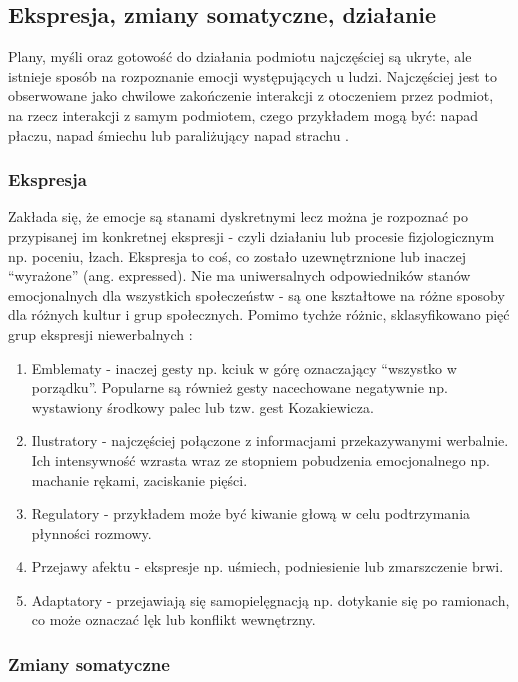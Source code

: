 \subsection{Ekspresja, zmiany somatyczne, działanie}

Plany, myśli oraz gotowość do działania podmiotu najczęściej są ukryte, ale istnieje sposób na rozpoznanie emocji występujących u ludzi. Najczęściej jest to obserwowane jako chwilowe zakończenie interakcji z otoczeniem przez podmiot, na rzecz interakcji z samym podmiotem, czego przykładem mogą być: napad płaczu, napad śmiechu lub paraliżujący napad strachu \citep{oatly}.

\subsubsection{Ekspresja}

Zakłada się, że emocje są stanami dyskretnymi lecz można je rozpoznać po przypisanej im konkretnej ekspresji - czyli działaniu lub procesie fizjologicznym np. poceniu, łzach. Ekspresja to coś, co zostało uzewnętrznione lub inaczej ``wyrażone'' (ang. expressed). Nie ma uniwersalnych odpowiedników stanów emocjonalnych dla wszystkich społeczeństw - są one kształtowe na różne sposoby dla różnych kultur i grup społecznych. Pomimo tychże różnic, sklasyfikowano pięć grup ekspresji niewerbalnych \citep{oatly}:
\begin{enumerate}
  \item Emblematy - inaczej gesty np. kciuk w górę oznaczający ``wszystko w porządku''. Popularne są również gesty nacechowane negatywnie np. wystawiony środkowy palec lub tzw. gest Kozakiewicza.
  \item Ilustratory - najczęściej połączone z informacjami przekazywanymi werbalnie. Ich intensywność wzrasta wraz ze stopniem pobudzenia emocjonalnego np. machanie rękami, zaciskanie pięści.
  \item Regulatory - przykładem może być kiwanie głową w celu podtrzymania płynności rozmowy.
  \item Przejawy afektu - ekspresje np. uśmiech, podniesienie lub zmarszczenie brwi.
  \item Adaptatory - przejawiają się samopielęgnacją np. dotykanie się po ramionach, co może oznaczać lęk lub konflikt wewnętrzny.
\end{enumerate}

\subsubsection{Zmiany somatyczne}

